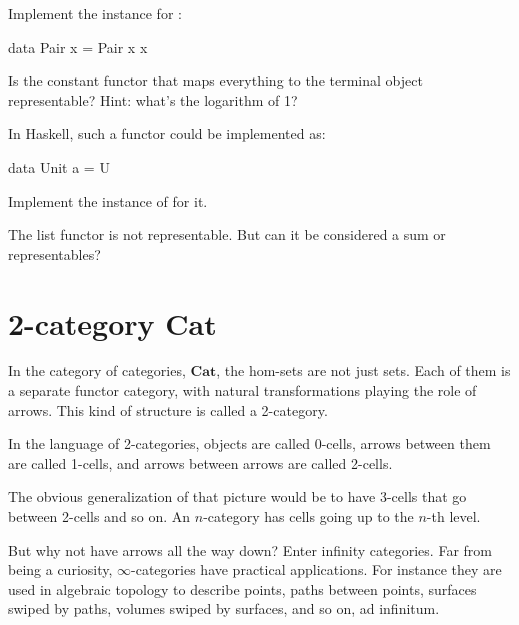 \documentclass[DaoFP]{subfiles}
\begin{document}
\begin{exercise}
Implement the  instance for :
\begin{haskell}
data Pair x = Pair x x
\end{haskell}
\end{exercise}

\begin{exercise}
Is the constant functor that maps everything to the terminal object representable? Hint: what's the logarithm of 1?

In Haskell, such a functor could be implemented as:
\begin{haskell}
data Unit a = U
\end{haskell}
Implement the instance of  for it.
\end{exercise}

\begin{exercise}
The list functor is not representable. But can it be considered a sum or representables?
\end{exercise}

\section{2-category  $\mathbf{Cat}$ }

In the category of categories, $\mathbf{Cat}$, the hom-sets are not just sets. Each of them is a separate functor category, with natural transformations playing the role of arrows. This kind of structure is called a 2-category. 

In the language of 2-categories, objects are called 0-cells, arrows between them are called 1-cells, and arrows between arrows are called 2-cells. 

The obvious generalization of that picture would be to have 3-cells that go between 2-cells and so on. An $n$-category has cells going up to the $n$-th level. 

But why not have arrows all the way down? Enter infinity categories. Far from being a curiosity, $\infty$-categories have practical applications. For instance they are used in algebraic topology to describe points, paths between points, surfaces swiped by paths, volumes swiped by surfaces, and so on, ad infinitum. 
\end{document}
